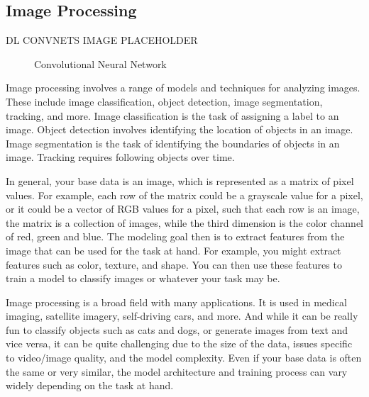 \documentclass[
  letterpaper,
]{krantz}
\begin{document}
\subsection{Image Processing}\label{image-processing}

DL CONVNETS IMAGE PLACEHOLDER

\begin{figure}[H]


\caption{\label{fig-cnn}Convolutional Neural Network}

\end{figure}%

Image processing involves a range of models and techniques for analyzing
images. These include image classification, object detection, image
segmentation, tracking, and more. Image classification is the task of
assigning a label to an image. Object detection involves identifying the
location of objects in an image. Image segmentation is the task of
identifying the boundaries of objects in an image. Tracking requires
following objects over time.

In general, your base data is an image, which is represented as a matrix
of pixel values. For example, each row of the matrix could be a
grayscale value for a pixel, or it could be a vector of RGB values for a
pixel, such that each row is an image, the matrix is a collection of
images, while the third dimension is the color channel of red, green and
blue. The modeling goal then is to extract features from the image that
can be used for the task at hand. For example, you might extract
features such as color, texture, and shape. You can then use these
features to train a model to classify images or whatever your task may
be.

Image processing is a broad field with many applications. It is used in
medical imaging, satellite imagery, self-driving cars, and more. And
while it can be really fun to classify objects such as cats and dogs, or
generate images from text and vice versa, it can be quite challenging
due to the size of the data, issues specific to video/image quality, and
the model complexity. Even if your base data is often the same or very
similar, the model architecture and training process can vary widely
depending on the task at hand.
\end{document}

